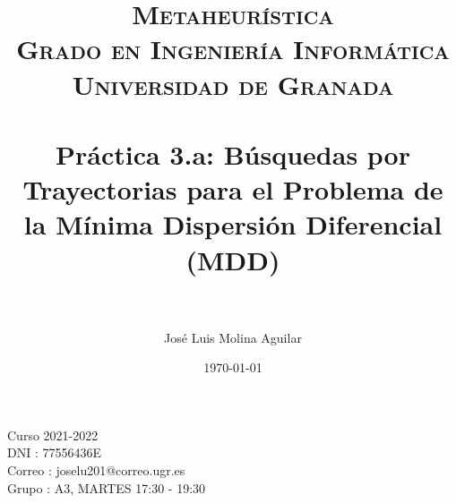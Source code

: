 

\everymath{\displaystyle}

\title{	
\normalfont \normalsize 
\textsc{\textbf{Metaheurística} \\ Grado en Ingeniería Informática \\ Universidad de Granada} \\ [25pt] %
\horrule{0.5pt} \\[0.4cm] %
\huge Práctica 3.a:
Búsquedas por Trayectorias para el
Problema de la Mínima Dispersión Diferencial
(MDD) \\ %
\horrule{2pt} \\[0.5cm] %
}

\author{José Luis Molina Aguilar} %

\date{\normalsize\today} %






\maketitle %
  \begin{large}
    \centering
  \vfill
  
  Curso 2021-2022\\
  DNI : 77556436E\\
  Correo : joselu201@correo.ugr.es\\
  Grupo : A3, MARTES 17:30 - 19:30
  \vfill
  \end{large}
\newpage %

\tableofcontents %

\listoffigures


\newpage




